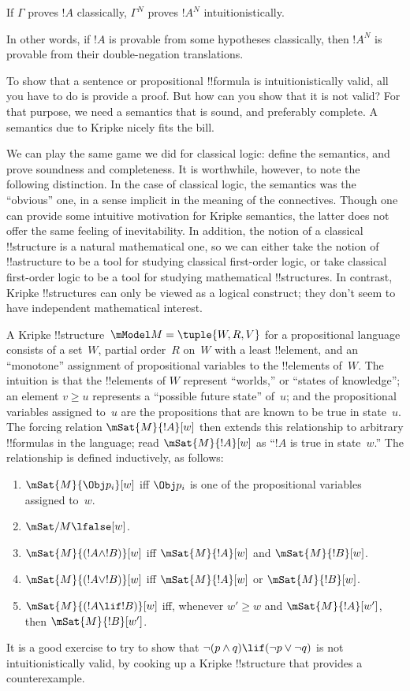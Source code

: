\documentclass[../../../include/open-logic-section]{subfiles}
\begin{document}
\begin{thm}
If $\Gamma$ proves $!A$ classically, $\Gamma^N$ proves $!A^N$
intuitionistically.
\end{thm}

In other words, if $!A$ is provable from some hypotheses classically,
then $!A^N$ is provable from their double-negation translations.

To show that a sentence or propositional !!{formula} is intuitionistically
valid, all you have to do is provide a proof. But how can you show
that it is not valid? For that purpose, we need a semantics
that is sound, and preferably complete. A semantics
due to Kripke nicely fits the bill.

We can play the same game we did for classical logic: define the
semantics, and prove soundness and completeness. It is worthwhile,
however, to note the following distinction. In the case of classical
logic, the semantics was the ``obvious'' one, in a sense implicit in
the meaning of the connectives. Though one can provide some intuitive
motivation for Kripke semantics, the latter does not offer the same
feeling of inevitability. In addition, the notion of a classical
!!{structure} is a natural mathematical one, so we can either take the
notion of !!a{structure} to be a tool for studying classical first-order
logic, or take classical first-order logic to be a tool for studying
mathematical !!{structure}s. In contrast, Kripke !!{structure}s can only be
viewed as a logical construct; they don't seem to have independent
mathematical interest.

A Kripke !!{structure}~$\mModel M = \tuple{W, R, V}$ for a propositional
language consists of a set~$W$, partial order~$R$ on~$W$ with a least
!!{element}, and an ``monotone'' assignment of propositional variables to
the !!{element}s of~$W$. The intuition is that the !!{element}s of $W$
represent ``worlds,'' or ``states of knowledge''; an element $v \geq
u$ represents a ``possible future state'' of~$u$; and the
propositional variables assigned to~$u$ are the propositions that are
known to be true in state~$u$. The forcing relation $\mSat{M}{!A}[w]$
then extends this relationship to arbitrary !!{formula}s in the
language; read $\mSat{M}{!A}[w]$ as ``$!A$ is true in state~$w$.'' The
relationship is defined inductively, as follows:
\begin{enumerate}
\item $\mSat{M}{\Obj p_i}[w]$ iff $\Obj p_i$ is one of the
  propositional variables assigned to~$w$.
\item $\mSat/{M}{\lfalse}[w]$.
\item $\mSat{M}{(!A \land !B)}[w]$ iff $\mSat{M}{!A}[w]$ and $\mSat{M}{!B}[w]$.
\item $\mSat{M}{(!A \lor !B)}[w]$ iff $\mSat{M}{!A}[w]$ or $\mSat{M}{!B}[w]$.
\item $\mSat{M}{(!A \lif !B)}[w]$ iff, whenever $w' \geq w$ and
  $\mSat{M}{!A}[w']$, then $\mSat{M}{!B}[w']$.
\end{enumerate}
It is a good exercise to try to show that $\lnot (p \land q) \lif
(\lnot p \lor \lnot q)$ is not intuitionistically valid, by cooking up a
Kripke !!{structure} that provides a counterexample.
\end{document}
